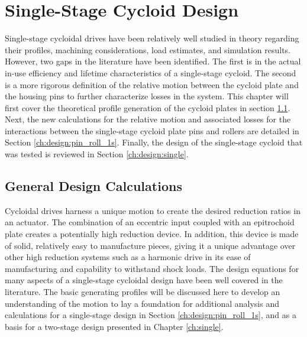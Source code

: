 
\chapter{Single-Stage Cycloid Design}\label{ch:design_1s}

Single-stage cycloidal drives have been relatively well studied in theory regarding their profiles, machining considerations, load estimates, and simulation results. However, two gaps in the literature have been identified. The first is in the actual in-use efficiency and lifetime characteristics of a single-stage cycloid. The second is a more rigorous definition of the relative motion between the cycloid plate and the housing pins to further characterize losses in the system. This chapter will first cover the theoretical profile generation of the cycloid plates in section \ref{ch:design:basic_calc}. Next, the new calculations for the relative motion and associated losses for the interactions between the single-stage cycloid plate pins and rollers are detailed in Section \ref{ch:design:pin_roll_1s}. Finally, the design of the single-stage cycloid that was tested is reviewed in Section \ref{ch:design:single}.

\section{General Design Calculations} \label{ch:design:basic_calc}

Cycloidal drives harness a unique motion to create the desired reduction ratios in an actuator. The combination of an eccentric input coupled with an epitrochoid plate creates a potentially high reduction device. In addition, this device is made of solid, relatively easy to manufacture pieces, giving it a unique advantage over other high reduction systems such as a harmonic drive in its ease of manufacturing and capability to withstand shock loads. The design equations for many aspects of a single-stage cycloidal design have been well covered in the literature. The basic generating profiles will be discussed here to develop an understanding of the motion to lay a foundation for additional analysis and calculations for a single-stage design in Section \ref{ch:design:pin_roll_1s}, and as a basis for a two-stage design presented in Chapter \ref{ch:single}. 

